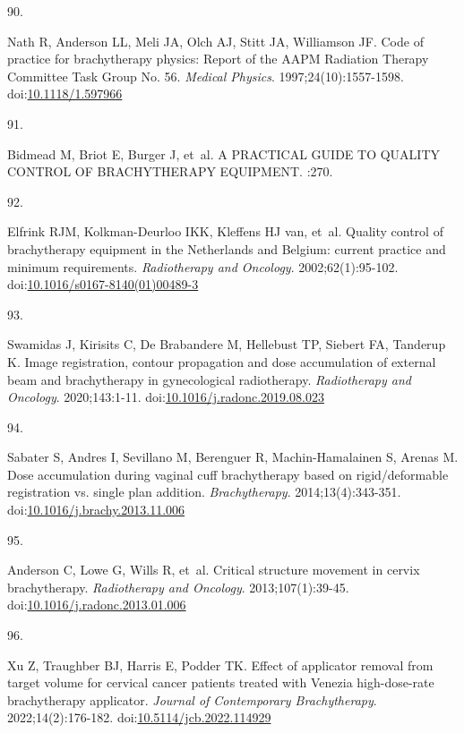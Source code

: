 \documentclass[
  a4paper,
]{scrreprt}
\newlength{\cslhangindent}
\newlength{\csllabelwidth}
\newlength{\cslentryspacingunit} %
\newenvironment{CSLReferences}[2] %
 {%
  \setlength{\parindent}{0pt}
  \ifodd #1
  \let\oldpar\par
  \def\par{\hangindent=\cslhangindent\oldpar}
  \fi
  \setlength{\parskip}{#2\cslentryspacingunit}
 }%
 {}
\newcommand{\CSLLeftMargin}[1]{\parbox[t]{\csllabelwidth}{#1}}
\newcommand{\CSLRightInline}[1]{\parbox[t]{\linewidth - \csllabelwidth}{#1}\break}
\begin{document}
\begin{CSLReferences}{0}{0}
\leavevmode{}%
\CSLLeftMargin{90. }%
\CSLRightInline{Nath R, Anderson LL, Meli JA, Olch AJ, Stitt JA,
Williamson JF. Code of practice for brachytherapy physics: Report of the
AAPM Radiation Therapy Committee Task Group No. 56. \emph{Medical
Physics}. 1997;24(10):1557-1598.
doi:\href{https://doi.org/10.1118/1.597966}{10.1118/1.597966}}

\leavevmode{}%
\CSLLeftMargin{91. }%
\CSLRightInline{Bidmead M, Briot E, Burger J, et~al. A {PRACTICAL GUIDE
TO QUALITY CONTROL OF BRACHYTHERAPY EQUIPMENT}. :270.}

\leavevmode{}%
\CSLLeftMargin{92. }%
\CSLRightInline{Elfrink RJM, Kolkman-Deurloo IKK, Kleffens HJ van,
et~al. Quality control of brachytherapy equipment in the Netherlands and
Belgium: current practice and minimum requirements. \emph{Radiotherapy
and Oncology}. 2002;62(1):95-102.
doi:\href{https://doi.org/10.1016/s0167-8140(01)00489-3}{10.1016/s0167-8140(01)00489-3}}

\leavevmode{}%
\CSLLeftMargin{93. }%
\CSLRightInline{Swamidas J, Kirisits C, De Brabandere M, Hellebust TP,
Siebert FA, Tanderup K. Image registration, contour propagation and dose
accumulation of external beam and brachytherapy in gynecological
radiotherapy. \emph{Radiotherapy and Oncology}. 2020;143:1-11.
doi:\href{https://doi.org/10.1016/j.radonc.2019.08.023}{10.1016/j.radonc.2019.08.023}}

\leavevmode{}%
\CSLLeftMargin{94. }%
\CSLRightInline{Sabater S, Andres I, Sevillano M, Berenguer R,
Machin-Hamalainen S, Arenas M. Dose accumulation during vaginal cuff
brachytherapy based on rigid/deformable registration vs. single plan
addition. \emph{Brachytherapy}. 2014;13(4):343-351.
doi:\href{https://doi.org/10.1016/j.brachy.2013.11.006}{10.1016/j.brachy.2013.11.006}}

\leavevmode{}%
\CSLLeftMargin{95. }%
\CSLRightInline{Anderson C, Lowe G, Wills R, et~al. Critical structure
movement in cervix brachytherapy. \emph{Radiotherapy and Oncology}.
2013;107(1):39-45.
doi:\href{https://doi.org/10.1016/j.radonc.2013.01.006}{10.1016/j.radonc.2013.01.006}}

\leavevmode{}%
\CSLLeftMargin{96. }%
\CSLRightInline{Xu Z, Traughber BJ, Harris E, Podder TK. Effect of
applicator removal from target volume for cervical cancer patients
treated with Venezia high-dose-rate brachytherapy applicator.
\emph{Journal of Contemporary Brachytherapy}. 2022;14(2):176-182.
doi:\href{https://doi.org/10.5114/jcb.2022.114929}{10.5114/jcb.2022.114929}}


\end{CSLReferences}
\end{document}

